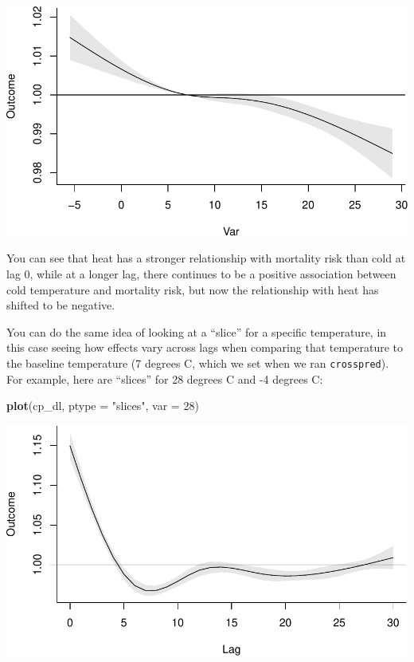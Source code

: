 \documentclass[
]{book}
\newenvironment{Shaded}{\begin{snugshade}}{\end{snugshade}}
\newcommand{\DataTypeTok}[1]{\textcolor[rgb]{0.13,0.29,0.53}{#1}}
\newcommand{\DecValTok}[1]{\textcolor[rgb]{0.00,0.00,0.81}{#1}}
\newcommand{\KeywordTok}[1]{\textcolor[rgb]{0.13,0.29,0.53}{\textbf{#1}}}
\newcommand{\NormalTok}[1]{#1}
\newcommand{\StringTok}[1]{\textcolor[rgb]{0.31,0.60,0.02}{#1}}
\begin{document}
\includegraphics{adv_epi_analysis_files/figure-latex/unnamed-chunk-105-2.pdf}

You can see that heat has a stronger relationship with mortality risk than cold at lag 0,
while at a longer lag, there continues to be a positive association between cold temperature
and mortality risk, but now the relationship with heat has shifted to be negative.

You can do the same idea of looking at a ``slice'' for a specific temperature, in this case
seeing how effects vary across lags when comparing that temperature to the baseline temperature
(7 degrees C, which we set when we ran \texttt{crosspred}). For example, here are ``slices'' for
28 degrees C and -4 degrees C:

\begin{Shaded}
\begin{Highlighting}[]
\KeywordTok{plot}\NormalTok{(cp_dl, }\DataTypeTok{ptype =} \StringTok{"slices"}\NormalTok{, }\DataTypeTok{var =} \DecValTok{28}\NormalTok{)}
\end{Highlighting}
\end{Shaded}

\includegraphics{adv_epi_analysis_files/figure-latex/unnamed-chunk-106-1.pdf}
\end{document}
